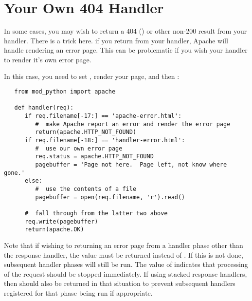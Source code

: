 \section{Your Own 404 Handler\label{tut-404-handler}}

In some cases, you may wish to return a 404 () or
other non-200 result from your handler.  There is a trick here.  if you
return  from your handler, Apache will handle
rendering an error page.  This can be problematic if you wish your handler
to render it's own error page.

In this case, you need to set ,
render your page, and then :

\begin{verbatim}
   from mod_python import apache

   def handler(req):
      if req.filename[-17:] == 'apache-error.html':
         #  make Apache report an error and render the error page
         return(apache.HTTP_NOT_FOUND)
      if req.filename[-18:] == 'handler-error.html':
         #  use our own error page
         req.status = apache.HTTP_NOT_FOUND
         pagebuffer = 'Page not here.  Page left, not know where gone.'
      else:
         #  use the contents of a file
         pagebuffer = open(req.filename, 'r').read()

      #  fall through from the latter two above
      req.write(pagebuffer)
      return(apache.OK)
\end{verbatim}

Note that if wishing to returning an error page from a handler phase other
than the response handler, the value  must be returned
instead of . If this is not done, subsequent handler phases
will still be run. The value of  indicates that processing
of the request should be stopped immediately. If using stacked response
handlers, then  should also be returned in that situation
to prevent subsequent handlers registered for that phase being run if
appropriate.
